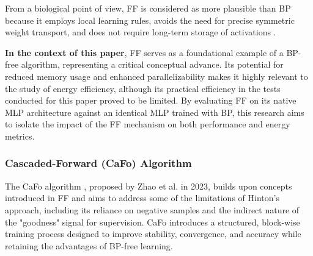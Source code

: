 From a biological point of view, FF is considered as more plausible than BP because it employs local learning rules, avoids the need for precise symmetric weight transport, and does not require long-term storage of activations \cite{hinton2022forward}.

\textbf{In the context of this paper}, FF serves as a foundational example of a BP-free algorithm, representing a critical conceptual advance. Its potential for reduced memory usage and enhanced parallelizability makes it highly relevant to the study of energy efficiency, although its practical efficiency in the tests conducted for this paper proved to be limited. By evaluating FF on its native MLP architecture against an identical MLP trained with BP, this research aims to isolate the impact of the FF mechanism on both performance and energy metrics.

\subsubsection{Cascaded-Forward (CaFo) Algorithm}
\label{subsec:cafo_algorithm_chap2}

The CaFo algorithm \cite{zhao2023cafo}, proposed by Zhao et al. in 2023, builds upon concepts introduced in FF and aims to address some of the limitations of Hinton's approach, including its reliance on negative samples and the indirect nature of the "goodness" signal for supervision. CaFo introduces a structured, block-wise training process designed to improve stability, convergence, and accuracy while retaining the advantages of BP-free learning.

